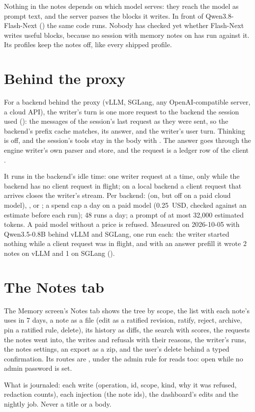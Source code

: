 Nothing in the notes depends on which model serves: they reach the model as prompt text, and the server parses the blocks it writes. In front of Qwen3.8-Flash-Next () the same code runs. Nobody has checked yet whether Flash-Next writes useful blocks, because no session with memory notes on has run against it. Its profiles keep the notes off, like every shipped profile.

\section{Behind the proxy}

For a backend behind the proxy (vLLM, SGLang, any OpenAI-compatible server, a cloud API), the writer's turn is one more request to the backend the session used (): the messages of the session's last request as they were sent, so the backend's prefix cache matches, its answer, and the writer's user turn. Thinking is off, and the session's tools stay in the body with . The answer goes through the engine writer's own parser and store, and the request is a ledger row of the client .

It runs in the backend's idle time: one writer request at a time, only while the backend has no client request in flight; on a local backend a client request that arrives closes the writer's stream. Per backend:   (on, but off on a paid cloud model), ,  or ; a spend cap a day on a paid model (0.25~USD, checked against an estimate before each run); 48 runs a day; a prompt of at most 32,000 estimated tokens. A paid model without a price is refused. Measured on 2026-10-05 with Qwen3.5-0.8B behind vLLM and SGLang, one run each: the writer started nothing while a client request was in flight, and with an answer prefill it wrote 2 notes on vLLM and 1 on SGLang (\measured).

\section{The Notes tab}

The Memory screen's Notes tab shows the tree by scope, the list with each note's uses in 7 days, a note as a file (edit as a ratified revision, ratify, reject, archive, pin a ratified rule, delete), its history as diffs, the search with scores, the requests the notes went into, the writes and refusals with their reasons, the writer's runs, the notes settings, an export as a zip, and the user's delete behind a typed confirmation. Its routes are , under the admin rule for reads too: open while no admin password is set.

What is journaled: each write (operation, id, scope, kind, why it was refused, redaction counts), each injection (the note ids), the dashboard's edits and the nightly job. Never a title or a body.
